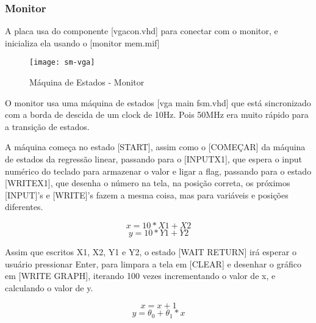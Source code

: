 \subsubsection{Monitor}

A placa usa do componente [vgacon.vhd] para conectar com o monitor, e inicializa ela usando o [monitor mem.mif]

    \begin{figure} [H] 
        \texttt{[image: sm-vga]}
        \caption{Máquina de Estados - Monitor}
        \label{fig:sm-vga}
    \end{figure}


O monitor usa uma máquina de estados [vga main fsm.vhd] que está sincronizado com a borda de descida de um clock de 10Hz.
Pois 50MHz era muito rápido para a transição de estados.

A máquina começa no estado [START], assim como o [COMEÇAR] da máquina de estados da regressão linear, 
passando para o [INPUTX1], que espera o input numérico do teclado para armazenar o valor e ligar a flag, passando para o estado [WRITEX1], 
que desenha o número na tela, na posição correta, os próximos [INPUT]'s e [WRITE]'s fazem a mesma coisa, mas para variáveis e posições
diferentes.

$$ x = 10 * X1 + X2 $$
$$ y = 10 * Y1 + Y2 $$

Assim que escritos X1, X2, Y1 e Y2, o estado [WAIT RETURN] irá esperar o usuário pressionar Enter, para limpara a tela em [CLEAR] e desenhar
o gráfico em [WRITE GRAPH], iterando 100 vezes incrementando o valor de x, e calculando o valor de y.

$$ x = x + 1 $$
$$ y = \theta_0 + \theta_1 * x $$

